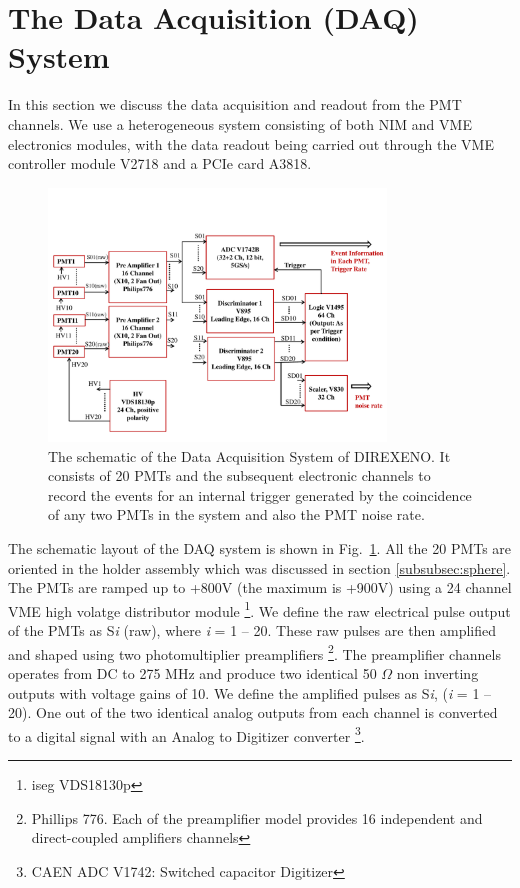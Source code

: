 \section{The Data Acquisition (DAQ) System }
\label{sec:DAQ}


In this section we discuss the data acquisition and readout from the PMT 
channels. We use a heterogeneous system consisting of both 
NIM and VME electronics modules, with the data readout being carried out through 
the VME controller module V2718 and a PCIe card A3818. 

\begin{figure}[t]
   \centering
   \includegraphics[width=0.8\textwidth]{DAQscheme.pdf}
   \caption{The schematic of the Data Acquisition System of DIREXENO. It 
        consists of 20 PMTs and the subsequent electronic channels to record 
        the events for an internal trigger generated by the coincidence of any 
        two PMTs in the system and also the PMT noise rate.}
   \label{Fig:DAQscheme}
\end{figure}

The schematic layout 
of the DAQ system is shown in Fig.~{\ref{Fig:DAQscheme}}. All the 20 PMTs 
are oriented in the holder assembly which was discussed in section \ref{subsubsec:sphere}. 
The PMTs are ramped up to +800V (the maximum is +900V) using a 24 channel 
VME high volatge distributor module \footnote{iseg VDS18130p}.  
We define the raw electrical pulse output of the PMTs as S{\it i} (raw), where {\it i} = 1 -- 20. 
These raw pulses are then 
amplified and shaped using two photomultiplier preamplifiers \footnote{Phillips 776. 
Each of the preamplifier model provides 16 independent  and direct-coupled 
amplifiers channels}. The preamplifier channels operates from DC to 275 MHz and 
produce two identical 50 $\Omega$ non inverting outputs with voltage gains of 10. 
We define the amplified pulses as S{\it i}, ({\it i} = 1 -- 20). One out of the 
two identical analog outputs from each channel is converted to a digital 
signal with an Analog to Digitizer converter \footnote{CAEN ADC V1742: Switched capacitor Digitizer}. 

